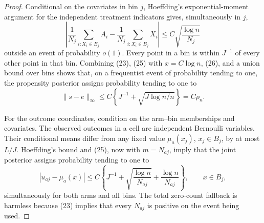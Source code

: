 \documentclass{article}
\begin{document}
\begin{proof}
Conditional on the covariates in bin \(j\), Hoeffding's exponential-moment argument for the independent treatment indicators gives, simultaneously in \(j\),
\begin{equation}
 \left|\frac1{N_j}\sum_{i:X_i\in B_j}A_i-\frac1{N_j}\sum_{i:X_i\in B_j}X_i\right|
 \le C\sqrt{\frac{\log n}{N_j}}                                                         \tag{26}
\end{equation}
outside an event of probability \(o(1)\).  Every point in a bin is within \(J^{-1}\) of every other point in that bin.  Combining (23), (25) with \(x=C\log n\), (26), and a union bound over bins shows that, on a frequentist event of probability tending to one, the propensity posterior assigns probability tending to one to
\begin{equation}
 \|s-e\|_\infty\le C\left\{J^{-1}+\sqrt{J\log n/n}\right\}=C\rho_n.                   \tag{27}
\end{equation}

For the outcome coordinates, condition on the arm--bin memberships and covariates.  The observed outcomes in a cell are independent Bernoulli variables.  Their conditional means differ from any fixed value \(\mu_a(x_j)\), \(x_j\in B_j\), by at most \(L/J\).  Hoeffding's bound and (25), now with \(m=N_{aj}\), imply that the joint posterior assigns probability tending to one to
\begin{equation}
 |u_{aj}-\mu_a(x)|
 \le C\left\{J^{-1}+\sqrt{\frac{\log n}{N_{aj}}}+\frac{\log n}{N_{aj}}\right\},
 \qquad x\in B_j,                                                                        \tag{28}
\end{equation}
simultaneously for both arms and all bins.  The total zero-count fallback is harmless because (23) implies that every \(N_{aj}\) is positive on the event being used.


\end{proof}
\end{document}
